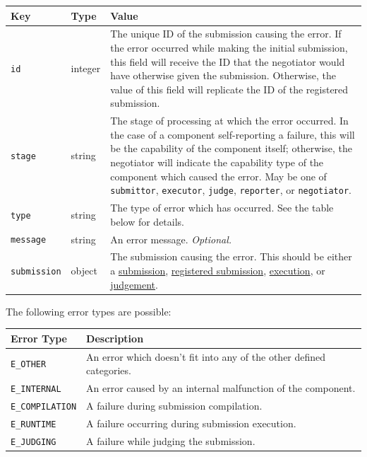 \documentclass[11pt,letterpaper]{article}
\begin{document}
\begin{tabulary}{\textwidth}{ | l | l | L | }
    \hline
    \textbf{Key} & \textbf{Type} & \textbf{Value} \\
    \hline
    \texttt{id} & integer & The unique ID of the submission causing the error.
        If the error occurred while making the initial submission, this field
        will receive the ID that the negotiator would have otherwise given the
        submission. Otherwise, the value of this field will replicate the ID of
        the registered submission. \\
    \hline
    \texttt{stage} & string & The stage of processing at which the error
        occurred. In the case of a component self-reporting a failure, this
        will be the capability of the component itself; otherwise, the
        negotiator will indicate the capability type of the component which
        caused the error.
        \newline
        \newline
        May be one of \texttt{submittor}, \texttt{executor}, \texttt{judge},
        \texttt{reporter}, or \texttt{negotiator}. \\
    \hline
    \texttt{type} & string & The type of error which has occurred. See the
        table below for details. \\
    \hline
    \texttt{message} & string & An error message. \emph{Optional.} \\
    \hline
    \texttt{submission} & object & The submission causing the error. This
        should be either a \hyperref[formats-sub]{submission},
        \hyperref[formats-reg-sub]{registered submission},
        \hyperref[formats-exec]{execution}, or
        \hyperref[formats-judge]{judgement}. \\
    \hline
\end{tabulary}

The following error types are possible:

\begin{tabulary}{\textwidth}{ | l | L | }
    \hline
    \textbf{Error Type} & \textbf{Description} \\
    \hline
    \texttt{E\_OTHER} & An error which doesn't fit into any of the other
        defined categories. \\
    \hline
    \texttt{E\_INTERNAL} & An error caused by an internal malfunction of the
        component. \\
    \hline
    \texttt{E\_COMPILATION} & A failure during submission compilation. \\
    \hline
    \texttt{E\_RUNTIME} & A failure occurring during submission execution. \\
    \hline
    \texttt{E\_JUDGING} & A failure while judging the submission. \\
    \hline
\end{tabulary}
\end{document}
